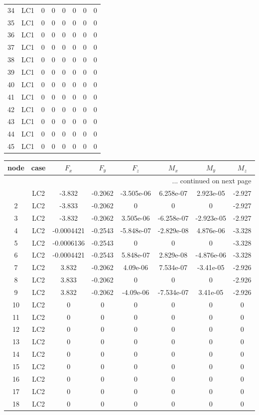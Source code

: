 \documentclass{article}%
\begin{document}
\begin{longtable}{| c c | c c c c c c |}
34&LC1&0&0&0&0&0&0\\%
35&LC1&0&0&0&0&0&0\\%
36&LC1&0&0&0&0&0&0\\%
37&LC1&0&0&0&0&0&0\\%
38&LC1&0&0&0&0&0&0\\%
39&LC1&0&0&0&0&0&0\\%
40&LC1&0&0&0&0&0&0\\%
41&LC1&0&0&0&0&0&0\\%
42&LC1&0&0&0&0&0&0\\%
43&LC1&0&0&0&0&0&0\\%
44&LC1&0&0&0&0&0&0\\%
45&LC1&0&0&0&0&0&0\\%
\end{longtable}%
\begin{longtable}{| c c | c c c c c c |}%
\hline%
node&case&$F_x$&$F_y$&$F_z$&$M_x$&$M_y$&$M_z$\\%
\hline%
\endhead%
\hline%
\multicolumn{8}{r}{... continued on next page}\\%
\endfoot%
\hline%
\endlastfoot%
1&LC2&{-}3.832&{-}0.2062&{-}3.505e{-}06&6.258e{-}07&2.923e{-}05&{-}2.927\\%
2&LC2&{-}3.833&{-}0.2062&0&0&0&{-}2.927\\%
3&LC2&{-}3.832&{-}0.2062&3.505e{-}06&{-}6.258e{-}07&{-}2.923e{-}05&{-}2.927\\%
4&LC2&{-}0.0004421&{-}0.2543&{-}5.848e{-}07&{-}2.829e{-}08&4.876e{-}06&{-}3.328\\%
5&LC2&{-}0.0006136&{-}0.2543&0&0&0&{-}3.328\\%
6&LC2&{-}0.0004421&{-}0.2543&5.848e{-}07&2.829e{-}08&{-}4.876e{-}06&{-}3.328\\%
7&LC2&3.832&{-}0.2062&4.09e{-}06&7.534e{-}07&{-}3.41e{-}05&{-}2.926\\%
8&LC2&3.833&{-}0.2062&0&0&0&{-}2.926\\%
9&LC2&3.832&{-}0.2062&{-}4.09e{-}06&{-}7.534e{-}07&3.41e{-}05&{-}2.926\\%
10&LC2&0&0&0&0&0&0\\%
11&LC2&0&0&0&0&0&0\\%
12&LC2&0&0&0&0&0&0\\%
13&LC2&0&0&0&0&0&0\\%
14&LC2&0&0&0&0&0&0\\%
15&LC2&0&0&0&0&0&0\\%
16&LC2&0&0&0&0&0&0\\%
17&LC2&0&0&0&0&0&0\\%
18&LC2&0&0&0&0&0&0\\%

\end{longtable}
\end{document}
